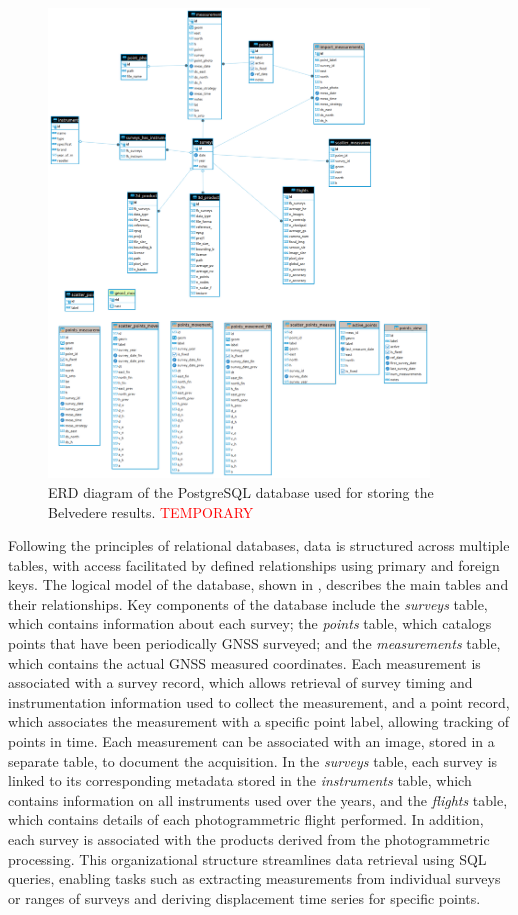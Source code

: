 \begin{figure}[ht!]
  \centering
  \includegraphics[width=0.9\textwidth]{belvederedb_erd.png}
  \caption{ERD diagram of the PostgreSQL database used for storing the Belvedere results. \textcolor{red}{TEMPORARY}}
  \label{fig:3:belvederedb_erd}
\end{figure}

Following the principles of relational databases, data is structured across multiple tables, with access facilitated by defined relationships using primary and foreign keys. 
The logical model of the database, shown in , describes the main tables and their relationships.
Key components of the database include the \textit{surveys} table, which contains information about each survey; the \textit{points} table, which catalogs points that have been periodically GNSS surveyed; and the \textit{measurements} table, which contains the actual GNSS measured coordinates. 
Each measurement is associated with a survey record, which allows retrieval of survey timing and instrumentation information used to collect the measurement, and a point record, which associates the measurement with a specific point label, allowing tracking of points in time.
Each measurement can be associated with an image, stored in a separate table, to document the acquisition.
In the \textit{surveys} table, each survey is linked to its corresponding metadata stored in the \textit{instruments} table, which contains information on all instruments used over the years, and the \textit{flights} table, which contains details of each photogrammetric flight performed.
In addition, each survey is associated with the products derived from the photogrammetric processing.
This organizational structure streamlines data retrieval using SQL queries, enabling tasks such as extracting measurements from individual surveys or ranges of surveys and deriving displacement time series for specific points.

